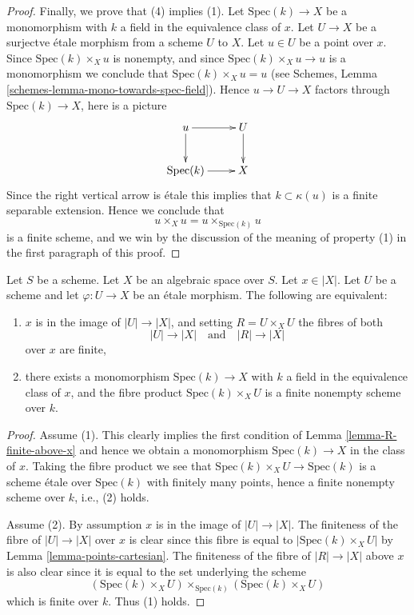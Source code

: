 \begin{proof}
\medskip\noindent
Finally, we prove that (4) implies (1). Let $\text{Spec}(k) \to X$
be a monomorphism with $k$ a field in the equivalence class of $x$.
Let $U \to X$ be a surjectve \'etale morphism from a scheme $U$ to $X$.
Let $u \in U$ be a point over $x$. Since $\text{Spec}(k) \times_X u$
is nonempty, and since $\text{Spec}(k) \times_X u \to u$ is a monomorphism
we conclude that $\text{Spec}(k) \times_X u = u$ (see
Schemes, Lemma \ref{schemes-lemma-mono-towards-spec-field}).
Hence $u \to U \to X$ factors through $\text{Spec}(k) \to X$, here is
a picture
$$
\xymatrix{
u \ar[r] \ar[d] & U \ar[d] \\
\text{Spec}(k) \ar[r] & X
}
$$
Since the right vertical arrow is \'etale this implies that
$k \subset \kappa(u)$ is a finite separable extension. Hence we conclude that
$$
u \times_X u = u \times_{\text{Spec}(k)} u
$$
is a finite scheme, and we win by the discussion of the meaning of property
(1) in the first paragraph of this proof.
\end{proof}

\begin{lemma}
\label{lemma-weak-UR-finite-above-x}
Let $S$ be a scheme. Let $X$ be an algebraic space over $S$.
Let $x \in |X|$.
Let $U$ be a scheme and let $\varphi : U \to X$ be an \'etale morphism.
The following are equivalent:
\begin{enumerate}
\item $x$ is in the image of $|U| \to |X|$, and
setting $R = U \times_X U$ the fibres of both
$$
|U| \longrightarrow |X|
\quad\text{and}\quad
|R| \longrightarrow |X|
$$
over $x$ are finite,
\item there exists a monomorphism $\text{Spec}(k) \to X$ with $k$ a field
in the equivalence class of $x$, and
the fibre product $\text{Spec}(k) \times_X U$ is
a finite nonempty scheme over $k$.
\end{enumerate}
\end{lemma}

\begin{proof}
Assume (1). This clearly implies the first condition of
Lemma \ref{lemma-R-finite-above-x} and hence we obtain a monomorphism
$\text{Spec}(k) \to X$ in the class of $x$. Taking the fibre product
we see that $\text{Spec}(k) \times_X U \to \text{Spec}(k)$ is a scheme
\'etale over $\text{Spec}(k)$ with finitely many points, hence a finite
nonempty scheme over $k$, i.e., (2) holds.

\medskip\noindent
Assume (2). By assumption $x$ is in the image of
$|U| \to |X|$. The finiteness of the fibre of
$|U| \to |X|$ over $x$ is clear since this fibre is equal to
$|\text{Spec}(k) \times_X U|$ by Lemma \ref{lemma-points-cartesian}.
The finiteness of the fibre of $|R| \to |X|$ above $x$ is also clear
since it is equal to the set underlying the scheme
$$
(\text{Spec}(k) \times_X U) \times_{\text{Spec}(k)} (\text{Spec}(k) \times_X U)
$$
which is finite over $k$. Thus (1) holds.
\end{proof}

